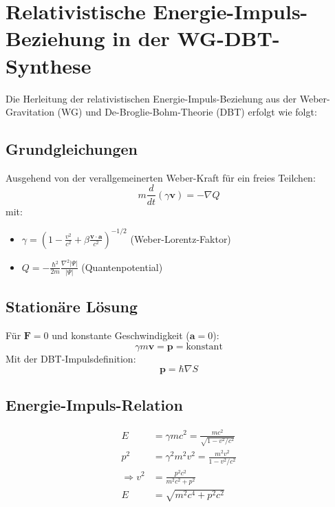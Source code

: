 \section{Relativistische Energie-Impuls-Beziehung in der WG-DBT-Synthese}
\label{sec:energy-momentum}

Die Herleitung der relativistischen Energie-Impuls-Beziehung aus der Weber-Gravitation (WG) und De-Broglie-Bohm-Theorie (DBT) erfolgt wie folgt:

\subsection{Grundgleichungen}
Ausgehend von der verallgemeinerten Weber-Kraft für ein freies Teilchen:
\begin{equation}
\label{eq:wg_dbt_srt}
    \boxed
    {
        m\frac{d}{dt}(\gamma\mathbf{v}) = -\nabla Q
    }
\end{equation}
mit:
\begin{itemize}
\item $\gamma = (1 - \frac{v^2}{c^2} + \beta\frac{\mathbf{v}\cdot\mathbf{a}}{c^2})^{-1/2}$ (Weber-Lorentz-Faktor)
\item $Q = -\frac{\hbar^2}{2m}\frac{\nabla^2|\Psi|}{|\Psi|}$ (Quantenpotential)
\end{itemize}

\subsection{Stationäre Lösung}
Für $\mathbf{F} = 0$ und konstante Geschwindigkeit ($\mathbf{a} = 0$):
\begin{equation}
\gamma m\mathbf{v} = \mathbf{p} = \text{konstant}
\end{equation}
Mit der DBT-Impulsdefinition:
\begin{equation}
\mathbf{p} = \hbar\nabla S
\end{equation}

\subsection{Energie-Impuls-Relation}
\begin{align}
E &= \gamma mc^2 = \frac{mc^2}{\sqrt{1-v^2/c^2}} \\
p^2 &= \gamma^2m^2v^2 = \frac{m^2v^2}{1-v^2/c^2} \\
\Rightarrow v^2 &= \frac{p^2c^2}{m^2c^2 + p^2} \\
E &= \sqrt{m^2c^4 + p^2c^2}
\end{align}

